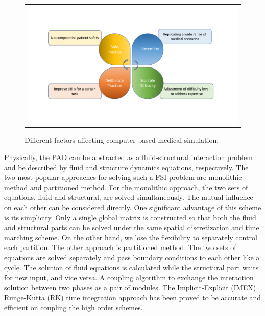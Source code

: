\begin{figure}[H]
	\centering
	\begin{tabular}{c}
		\includegraphics[width=1.0\textwidth]{./pics/computer_simulation}
	\end{tabular}
	\caption{\footnotesize Different factors affecting computer-based medical simulation.} \label{fig: ch1f1}
\end{figure}

Physically, the PAD can be abstracted as a fluid-structural interaction problem and be described by fluid and structure dynamics equations, respectively.  The two most popular approaches for solving such a FSI problem are monolithic method\cite{hubner2004monolithic, degroote2009performance} and partitioned method\cite{kuttler2008fixed, vierendeels2007implicit}. For the monolithic approach, the two sets of equations, fluid and structural, are solved simultaneously. The mutual influence on each other can be considered directly. One significant advantage of this scheme is its simplicity. Only a single global matrix is constructed so that both the fluid and structural parts can be solved under the same spatial discretization and time marching scheme. On the other hand, we lose the flexibility to separately control each partition. The other approach is partitioned method. The two sets of equations are solved separately and pass boundary conditions to each other like a cycle. The solution of fluid equations is calculated while the structural part waits for new input, and vice versa. A coupling algorithm to exchange the interaction solution between two phases as a pair of modules. The Implicit-Explicit (IMEX) Runge-Kutta (RK) time integration approach has been proved to be accurate and efficient on coupling the high order schemes\cite{zhang2016high}.

